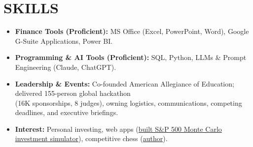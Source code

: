 \documentclass[a4paper,10pt]{article}
\renewcommand{\$}{{\fontencoding{OT1}\selectfont\char36}}
\begin{document}
\section*{SKILLS}
\begin{itemize}
\item \textbf{Finance Tools (Proficient):} MS Office (Excel, PowerPoint, Word), Google G-Suite Applications, Power BI.
\item \textbf{Programming \& AI Tools (Proficient):} SQL, Python, LLMs \& Prompt Engineering (Claude, ChatGPT).
\item \textbf{Leadership \& Events:} Co-founded American Allegiance of Education; delivered 155-person global hackathon\\
(\$16K sponsorships, 8 judges), owning logistics, communications, competing deadlines, and executive briefings.
\item \textbf{Interest:} Personal investing, web apps (\href{https://ajay8005.github.io/personal-website/webapp.html}{built S\&P 500 Monte Carlo investment simulator}), competitive chess (\href{https://www.amazon.com/Chess-Simplified-Foundations-Modern-Theory/dp/B0GCNCN597}{author}).
\end{itemize}
\end{document}

